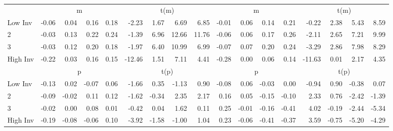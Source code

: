 \begin{table}[!ht]
\begin{tabular}{lrrrrrrrrrrrrrrrr}
  
    
      & \multicolumn{4}{c}{m} & \multicolumn{4}{c}{t(m)}
    
      & \multicolumn{4}{c}{m} & \multicolumn{4}{c}{t(m)}
    
    \\
      \cmidrule(r){2-5} \cmidrule(r){6-9} \cmidrule(r){10-13} \cmidrule(r){14-17}

    Low Inv   & -0.06  & 0.04  & 0.16  & 0.18  & -2.23  & 1.67  & 6.69  & 6.85  & -0.01  & 0.06  & 0.14  & 0.21  & -0.22  & 2.38  & 5.43  & 8.59  \\
           2  & -0.03  & 0.13  & 0.22  & 0.24  & -1.39  & 6.96  & 12.66  & 11.76  & -0.06  & 0.06  & 0.17  & 0.26  & -2.11  & 2.65  & 7.21  & 9.99  \\
           3  & -0.03  & 0.12  & 0.20  & 0.18  & -1.97  & 6.40  & 10.99  & 6.99  & -0.07  & 0.07  & 0.20  & 0.24  & -3.29  & 2.86  & 7.98  & 8.29  \\
    High Inv  & -0.22  & 0.03  & 0.16  & 0.15  & -12.46  & 1.51  & 7.11  & 4.41  & -0.28  & 0.00  & 0.06  & 0.14  & -11.63  & 0.01  & 2.17  & 4.35  \\

  
    
      & \multicolumn{4}{c}{p} & \multicolumn{4}{c}{t(p)}
    
      & \multicolumn{4}{c}{p} & \multicolumn{4}{c}{t(p)}
    
    \\
      \cmidrule(r){2-5} \cmidrule(r){6-9} \cmidrule(r){10-13} \cmidrule(r){14-17}

    Low Inv   & -0.13  & 0.02  & -0.07  & 0.06  & -1.66  & 0.35  & -1.13  & 0.90  & -0.08  & 0.06  & -0.03  & 0.00  & -0.94  & 0.90  & -0.38  & 0.07  \\
           2  & -0.09  & -0.02  & 0.11  & 0.12  & -1.62  & -0.34  & 2.35  & 2.17  & 0.16  & 0.05  & -0.15  & -0.10  & 2.33  & 0.76  & -2.42  & -1.39  \\
           3  & -0.02  & 0.00  & 0.08  & 0.01  & -0.42  & 0.04  & 1.62  & 0.11  & 0.25  & -0.01  & -0.16  & -0.41  & 4.02  & -0.19  & -2.44  & -5.34  \\
    High Inv  & -0.19  & -0.08  & -0.06  & 0.10  & -3.92  & -1.58  & -1.00  & 1.04  & 0.23  & -0.06  & -0.41  & -0.37  & 3.59  & -0.75  & -5.20  & -4.29  \\

  

  \bottomrule
\end{tabular}
\label{tbl:32_Size_BM_Inv_B2016}
\end{table}